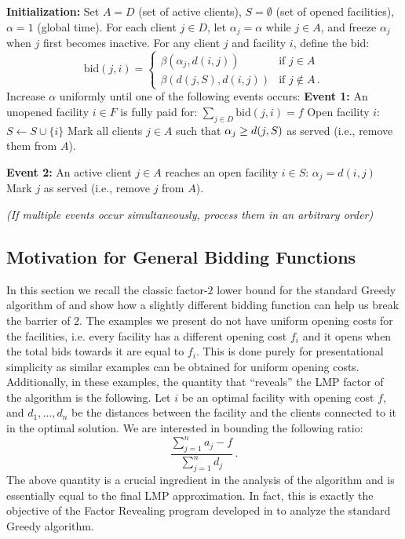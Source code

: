 \begin{algorithm}
\caption{Greedy Algorithm with a Generalized Bidding Strategy}
\label{alg:dual_generalized}
\begin{algorithmic}[h]
\State \textbf{Initialization:} Set $A=D$ (set of active clients), $S=\emptyset$ (set of opened facilities), $\alpha=1$ (global time).
\State For each client $j \in D$, let $\alpha_j=\alpha$ while $j \in A$, and freeze $\alpha_j$ when $j$ first becomes inactive.
\State For any client $j$ and facility $i$, define the bid:
\[
\text{bid}(j, i) = 
\begin{cases} 
\beta(\alpha_j, d(i,j)) & \text{if } j \in A \\
\beta(d(j,S), d(i,j)) & \text{if } j \notin A\,.
\end{cases}
\]
    \State Increase $\alpha$ uniformly until one of the following events occurs:
    \State \textbf{Event 1:} An unopened facility $i \in F$ is fully paid for: $\sum_{j \in D} \text{bid}(j, i) = f$
    \State \indent Open facility $i$: $S \gets S \cup \{i\}$
    \State \indent Mark all clients $j \in A$ such that $\alpha_j \geq d(j,S)$ as served (i.e., remove them from $A$).

    \State \textbf{Event 2:} An active client $j \in A$ reaches an open facility $i \in S$: $\alpha_j = d(i,j)$
    \State \indent Mark $j$ as served (i.e., remove $j$ from $A$).
    
    \Statex \textit{(If multiple events occur simultaneously, process them in an arbitrary order)}
\EndWhile
\end{algorithmic}
\end{algorithm}

\subsection{Motivation for General Bidding Functions}

In this section we recall the classic factor-$2$ lower bound for the standard Greedy algorithm
of \cite{JMS02, JainMMSV03} and show how a slightly different bidding function can help us break the barrier of $2$. The examples we present do not have uniform opening costs for the facilities, i.e. every facility has a different opening cost $f_i$ and it opens when
the total bids towards it are equal to $f_i$. This is done purely for presentational 
simplicity as similar examples can be obtained for uniform opening costs. Additionally,
in these examples, the quantity that ``reveals'' the LMP factor of the algorithm is the following. Let $i$ be an optimal facility with opening cost $f$, and $d_1, \dots, d_n$ 
be the distances between the facility and the clients connected to it in the optimal solution. We are interested in bounding the following ratio:
\[\frac{\sum_{j = 1}^n a_j - f}{\sum_{j = 1}^n d_j}\,.\]
\noindent The above quantity is a crucial ingredient in the analysis of the algorithm and is essentially equal to the final LMP approximation. In fact, this is exactly the objective of the Factor Revealing program developed
in \cite{JMS02, JainMMSV03} to analyze the standard Greedy algorithm.


